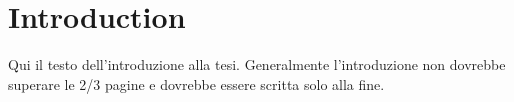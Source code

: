\chapter{Introduction}

Qui il testo dell'introduzione alla tesi. Generalmente l'introduzione non dovrebbe superare le 2/3 pagine e dovrebbe essere scritta solo alla fine.